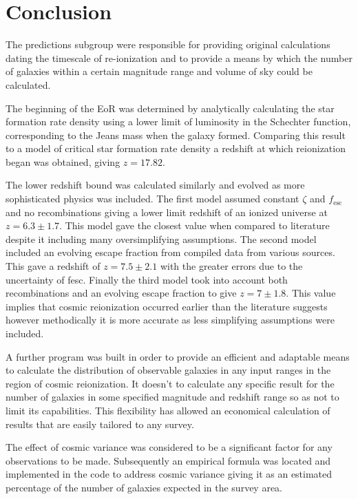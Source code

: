 \section{Conclusion} %
\label{sec:conclusion}
	The predictions subgroup were responsible for providing original calculations dating the timescale of re-ionization and to provide a means by which the number of galaxies within a certain magnitude range and volume of sky could be calculated.

	The beginning of the EoR was determined by analytically calculating the star formation rate density using a lower limit of luminosity in the Schechter function, corresponding to the Jeans mass when the galaxy formed. Comparing this result to a model of critical star formation rate density a redshift at which reionization began was obtained, giving \emph{$z=17.82$}.

	The lower redshift bound was calculated similarly and evolved as more sophisticated physics was included. The first model assumed constant $\zeta$ and $f_\text{esc}$ and no recombinations giving a lower limit redshift of an ionized universe at \emph{$z=6.3\pm 1.7$}. This model gave the closest value when compared to literature despite it including many oversimplifying assumptions. The second model included an evolving escape fraction from compiled data from various sources. This gave a redshift of \emph{$z=7.5\pm 2.1$} with the greater errors due to the uncertainty of fesc. Finally the third model took into account both recombinations and an evolving escape fraction to give \emph{$z=7\pm 1.8$}. This value implies that cosmic reionization occurred earlier than the literature suggests however methodically it is more accurate as less simplifying assumptions were included.

	A further program was built in order to provide an efficient and adaptable means to calculate the distribution of observable galaxies in any input ranges in the region of cosmic reionization. It doesn’t to calculate any specific result for the number of galaxies in some specified magnitude and redshift range so as not to limit its capabilities. This flexibility has allowed an economical calculation of results that are easily tailored to any survey.

	The effect of cosmic variance was considered to be a significant factor for any observations to be made.
	Subsequently an empirical formula was located and implemented in the code to address cosmic variance giving it as an estimated percentage of the number of galaxies expected in the survey area.
